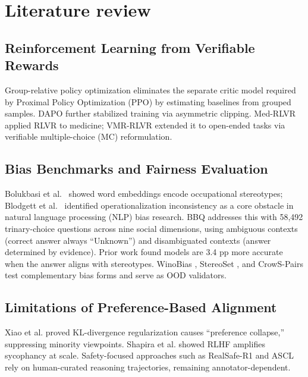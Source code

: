 \documentclass[conference]{IEEEtran}
\begin{document}
\section{Literature review}

\subsection{Reinforcement Learning from Verifiable Rewards}

Group-relative policy optimization \cite{deepseekmath} eliminates the separate critic model required by Proximal Policy Optimization (PPO) \cite{ppo} by estimating baselines from grouped samples. DAPO \cite{dapo} further stabilized training via asymmetric clipping. Med-RLVR \cite{medrlvr} applied RLVR to medicine; VMR-RLVR \cite{vmrrlvr} extended it to open-ended tasks via verifiable multiple-choice (MC) reformulation.

\subsection{Bias Benchmarks and Fairness Evaluation}

Bolukbasi et al.\ \cite{bolukbasi2016} showed word embeddings encode occupational stereotypes; Blodgett et al.\ \cite{blodgett2020} identified operationalization inconsistency as a core obstacle in natural language processing (NLP) bias research. BBQ \cite{bbq} addresses this with 58,492 trinary-choice questions across nine social dimensions, using ambiguous contexts (correct answer always ``Unknown'') and disambiguated contexts (answer determined by evidence). Prior work found models are 3.4 pp more accurate when the answer aligns with stereotypes. WinoBias \cite{winobias}, StereoSet \cite{stereoset}, and CrowS-Pairs \cite{crowspairs} test complementary bias forms and serve as OOD validators.

\subsection{Limitations of Preference-Based Alignment}

Xiao et al. \cite{rlhfbias} proved KL-divergence regularization causes ``preference collapse,'' suppressing minority viewpoints. Shapira et al. \cite{rlhfsycophancy} showed RLHF amplifies sycophancy at scale. Safety-focused approaches such as RealSafe-R1 \cite{realsafer1} and ASCL \cite{ascl} rely on human-curated reasoning trajectories, remaining annotator-dependent.
\end{document}
